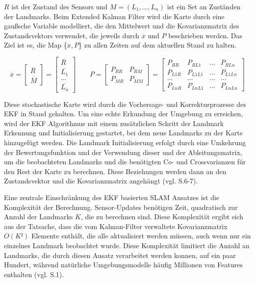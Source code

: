 \( R\) ist der Zustand des Sensors und \( M = (L_1, ..., L_n)\) ist ein Set an Zuständen der Landmarks.
Beim Extended Kalman Filter wird die Karte durch eine gaußsche Variable modelliert, die den Mittelwert und die Kovarianzmatrix des Zustandsvektors verwendet, die jeweils durch \(\overline{x}\) und \(P\) beschrieben werden. Das Ziel ist es, die Map \{\(\overline{x}, P\)\} zu allen Zeiten auf dem aktuellen Stand zu halten.


\begin{equation}
  \overline{x} =  
  		\begin{bmatrix}
		\overline{R}\\
		\overline{M}
     	\end{bmatrix}
     = 
     	\begin{bmatrix}
		\overline{R}\\
		\overline{L_1}\\
		...\\
		\overline{L_n}
     	\end{bmatrix}
     	\quad\quad
     P = 
     	\begin{bmatrix}
		P_{RR} & P_{RM}\\
		P_{MR} & P_{MM}
     	\end{bmatrix}
     = 
     	\begin{bmatrix}
		P_{RR} & P_{RL1} & ... & P_{RLn}\\
		P_{L1R} & P_{L1L1} & ... & P_{L1Ln}\\
		... & ... & ... & ... \\
		P_{LnR} & P_{LnL1} & ... & P_{LnLn}
     	\end{bmatrix}
\end{equation}

Diese stochastische Karte wird durch die Vorhersage- und Korrekturprozesse des EKF in Stand gehalten. Um eine echte Erkundung der Umgebung zu erreichen, wird der EKF Algorithmus mit einem zusätzlichen Schritt der Landmark Erkennung und Initialisierung gestartet, bei dem neue Landmarks zu der Karte hinzugefügt werden. Die Landmark Initialisierung erfolgt durch eine Umkehrung der Bewertungsfunktion und der Verwendung dieser und der Ableitungsmatrix, um die beobachteten Landmarks und die benötigten Co- und Crossvarianzen für den Rest der Karte zu berechnen. Diese Beziehungen werden dann an den Zustandsvektor und die Kovarianzmatrix angehängt (vgl. \cite{ekf_slam} S.6-7).

Eine zentrale Einschränkung des EKF basierten SLAM Ansatzes ist die Komplexität der Berechnung. Sensor-Updates benötigen Zeit, quadratisch zur Anzahl der Landmarks \(K\), die zu berechnen sind. Diese Komplexität ergibt sich aus der Tatsache, dass die vom Kalman-Filter verwaltete Kovarianzmatrix \(O(K²)\) Elemente enthält, die alle aktualisiert werden müssen, auch wenn nur ein einzelnes Landmark beobachtet wurde. Diese Komplexität limitiert die Anzahl an Landmarks, die durch diesen Ansatz verarbeitet werden konnen, auf ein paar Hundert, während natürliche Umgebungsmodelle häufig Millionen von Features enthalten (vgl. \cite{ekf_problems} S.1).


